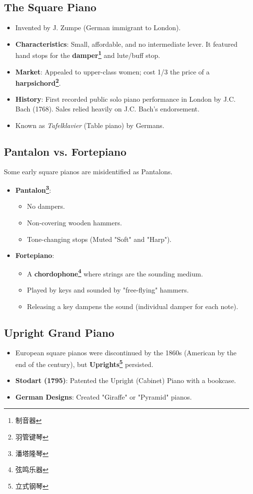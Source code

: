 \documentclass[math,code]{amznotes}
\theoremstyle{remark}
\begin{document}
\subsection{The Square Piano}
\begin{itemize}
    \item Invented by J. Zumpe (German immigrant to London).
    \item \textbf{Characteristics}: Small, affordable, and no intermediate lever. It featured hand stops for the \textbf{damper\footnote{制音器}} and lute/buff stop.
    \item \textbf{Market}: Appealed to upper-class women; cost 1/3 the price of a \textbf{harpsichord\footnote{羽管键琴}}.
    \item \textbf{History}: First recorded public solo piano performance in London by J.C. Bach (1768). Sales relied heavily on J.C. Bach's endorsement.
    \item Known as \textit{Tafelklavier} (Table piano) by Germans.
\end{itemize}

\subsection{Pantalon vs. Fortepiano}
Some early square pianos are misidentified as Pantalons.
\begin{itemize}
    \item \textbf{Pantalon\footnote{潘塔隆琴}}: 
    \begin{itemize}
        \item No dampers.
        \item Non-covering wooden hammers.
        \item Tone-changing stops (Muted "Soft" and "Harp").
    \end{itemize}
    \item \textbf{Fortepiano}:
    \begin{itemize}
        \item A \textbf{chordophone\footnote{弦鸣乐器}} where strings are the sounding medium.
        \item Played by keys and sounded by "free-flying" hammers.
        \item Releasing a key dampens the sound (individual damper for each note).
    \end{itemize}
\end{itemize}

\subsection{Upright Grand Piano}
\begin{itemize}
    \item European square pianos were discontinued by the 1860s (American by the end of the century), but \textbf{Uprights\footnote{立式钢琴}} persisted.
    \item \textbf{Stodart (1795)}: Patented the Upright (Cabinet) Piano with a bookcase.
    \item \textbf{German Designs}: Created "Giraffe" or "Pyramid" pianos.
\end{itemize}
\end{document}
